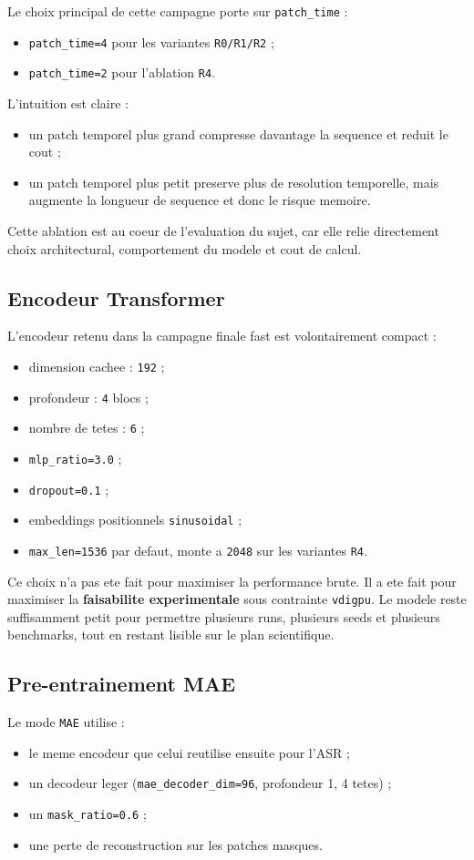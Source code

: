 \documentclass[11pt,a4paper]{article}
\begin{document}
Le choix principal de cette campagne porte sur \texttt{patch\_time} :
\begin{itemize}[leftmargin=1.2cm]
\item \texttt{patch\_time=4} pour les variantes \texttt{R0/R1/R2} ;
\item \texttt{patch\_time=2} pour l'ablation \texttt{R4}.
\end{itemize}

L'intuition est claire :
\begin{itemize}[leftmargin=1.2cm]
\item un patch temporel plus grand compresse davantage la sequence et reduit le cout ;
\item un patch temporel plus petit preserve plus de resolution temporelle, mais augmente la longueur de sequence et donc le risque memoire.
\end{itemize}

Cette ablation est au coeur de l'evaluation du sujet, car elle relie directement choix architectural, comportement du modele et cout de calcul.

\subsection{Encodeur Transformer}
L'encodeur retenu dans la campagne finale fast est volontairement compact :
\begin{itemize}[leftmargin=1.2cm]
\item dimension cachee : \texttt{192} ;
\item profondeur : \texttt{4} blocs ;
\item nombre de tetes : \texttt{6} ;
\item \texttt{mlp\_ratio=3.0} ;
\item \texttt{dropout=0.1} ;
\item embeddings positionnels \texttt{sinusoidal} ;
\item \texttt{max\_len=1536} par defaut, monte a \texttt{2048} sur les variantes \texttt{R4}.
\end{itemize}

Ce choix n'a pas ete fait pour maximiser la performance brute. Il a ete fait pour maximiser la \textbf{faisabilite experimentale} sous contrainte \texttt{vdigpu}. Le modele reste suffisamment petit pour permettre plusieurs runs, plusieurs seeds et plusieurs benchmarks, tout en restant lisible sur le plan scientifique.

\subsection{Pre-entrainement MAE}
Le mode \texttt{MAE} utilise :
\begin{itemize}[leftmargin=1.2cm]
\item le meme encodeur que celui reutilise ensuite pour l'ASR ;
\item un decodeur leger (\texttt{mae\_decoder\_dim=96}, profondeur 1, 4 tetes) ;
\item un \texttt{mask\_ratio=0.6} ;
\item une perte de reconstruction sur les patches masques.
\end{itemize}
\end{document}
